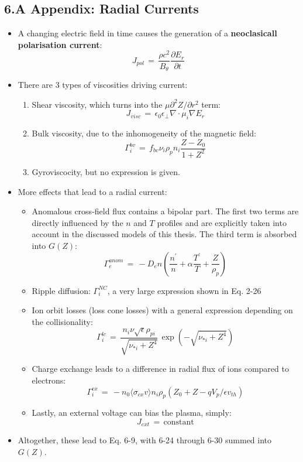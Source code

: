 \documentclass[a4paper]{article}
\begin{document}
\subsection{6.A Appendix: Radial
Currents}\label{a-appendix-radial-currents}

\begin{itemize}
\item
  A changing electric field in time causes the generation of a
  \textbf{neoclasicall polarisation current}:
  \[J_{pol} \,=\, \frac{\rho c^2}{B_{\theta}} \frac{\partial E_r}{\partial t}\]
\item
  There are 3 types of viscosities driving current:

  \begin{enumerate}
  \def\labelenumi{\arabic{enumi}.}
  \item
    Shear viscosity, which turns into the
    $\mu \partial^2 Z / \partial r^2$ term:
    \[J_{visc} \,=\, \epsilon_0 \epsilon_{\perp} \nabla \cdot \mu_i \nabla E_r\]
  \item
    Bulk viscosity, due to the inhomogeneity of the magnetic field:
    \[\Gamma_i^{bv} \,=\, f_{bv} \nu_i \rho_p n_i \frac{Z - Z_0}{1 + Z^2}\]
  \item
    Gyroviscocity, but no expression is given.
  \end{enumerate}
\item
  More effects that lead to a radial current:

  \begin{itemize}
  \item
    Anomalous cross-field flux contains a bipolar part. The first two
    terms are directly influenced by the $n$ and $T$ profiles and are
    explicitly taken into account in the discussed models of this
    thesis. The third term is absorbed into $G(Z)$:
    \[\Gamma_e^{anom} \,=\, -D_e n \left(\frac{n^\prime}{n} + \alpha\frac{T^\prime}{T} + \frac{Z}{\rho_p}\right)\]
  \item
    Ripple diffusion: $\Gamma_i^{NC}$, a very large expression shown in
    Eq. 2-26
  \item
    Ion orbit losses (loss cone losses) with a general expression
    depending on the collisionality:
    \[\Gamma_i^{lc} \,=\, \frac{n_i \nu \sqrt{\epsilon} \rho_{pi}}{\sqrt{\nu_{*i} + Z^4}} \, \exp\left(-\sqrt{\nu_{*i} + Z^4}\right)\]
  \item
    Charge exchange leads to a difference in radial flux of ions
    compared to electrons:
    \[\Gamma_i^{cx} \,=\, -n_0 \langle \sigma_{cx}v \rangle n_i \rho_p (Z_0 + Z - qV_p / \epsilon v_{th})\]
  \item
    Lastly, an external voltage can bias the plasma, simply:
    \[J_{ext} \,=\, \text{constant}\]
  \end{itemize}
\item
  Altogether, these lead to Eq. 6-9, with 6-24 through 6-30 summed into
  $G(Z)$.


\end{itemize}
\end{document}
